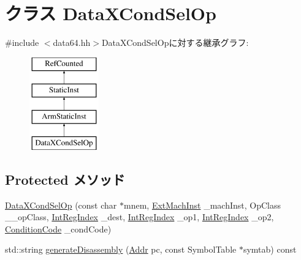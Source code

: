 \hypertarget{classArmISA_1_1DataXCondSelOp}{
\section{クラス DataXCondSelOp}
\label{classArmISA_1_1DataXCondSelOp}
}


{\ttfamily \#include $<$data64.hh$>$}DataXCondSelOpに対する継承グラフ:\begin{figure}[H]
\begin{center}
\leavevmode
\includegraphics[height=4cm]{classArmISA_1_1DataXCondSelOp}
\end{center}
\end{figure}
\subsection*{Protected メソッド}
\begin{DoxyCompactItemize}
\item 
\hyperlink{classArmISA_1_1DataXCondSelOp_af533c5d8adf699d15cdfd20967e921d8}{DataXCondSelOp} (const char $\ast$mnem, \hyperlink{classStaticInst_a5605d4fc727eae9e595325c90c0ec108}{ExtMachInst} \_\-machInst, OpClass \_\-\_\-opClass, \hyperlink{namespaceArmISA_ae64680ba9fb526106829d6bf92fc791b}{IntRegIndex} \_\-dest, \hyperlink{namespaceArmISA_ae64680ba9fb526106829d6bf92fc791b}{IntRegIndex} \_\-op1, \hyperlink{namespaceArmISA_ae64680ba9fb526106829d6bf92fc791b}{IntRegIndex} \_\-op2, \hyperlink{namespaceArmISA_ab8f08e777c4753720cff841f81da8e06}{ConditionCode} \_\-condCode)
\item 
std::string \hyperlink{classArmISA_1_1DataXCondSelOp_a95d323a22a5f07e14d6b4c9385a91896}{generateDisassembly} (\hyperlink{classm5_1_1params_1_1Addr}{Addr} pc, const SymbolTable $\ast$symtab) const 
\end{DoxyCompactItemize}
